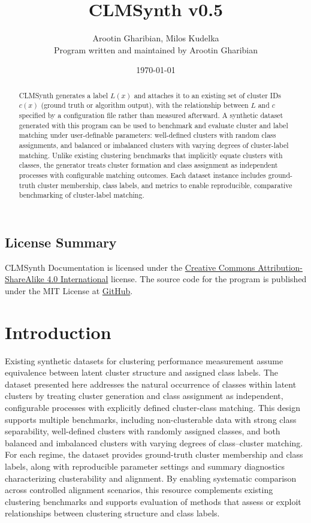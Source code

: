 \documentclass[a4paper,12pt]{article}
\title{CLMSynth v0.5}
\author{Arootin Gharibian, Milos Kudelka \\
\small\normalfont Program written and maintained by Arootin Gharibian}
\date{\today}
\begin{document}
\maketitle

\begin{abstract}
CLMSynth generates a label $L(x)$ and attaches it to an existing set of cluster IDs $c(x)$ (ground truth or algorithm output), with the relationship between $L$ and $c$ specified by a configuration file rather than measured afterward. A synthetic dataset generated with this program can be used to benchmark and evaluate cluster and label matching under user-definable parameters: well-defined clusters with random class assignments, and balanced or imbalanced clusters with varying degrees of cluster-label matching. Unlike existing clustering benchmarks that implicitly equate clusters with classes, the generator treats cluster formation and class assignment as independent processes with configurable matching outcomes.  Each dataset instance includes ground-truth cluster membership, class labels, and metrics to enable reproducible, comparative benchmarking of cluster-label matching.

\end{abstract}

\subsection*{License Summary}
CLMSynth Documentation is licensed under the \href{https://creativecommons.org/licenses/by-sa/4.0/}{Creative Commons Attribution-ShareAlike 4.0 International} license. The source code for the program is published under the MIT License at \href{https://github.com/A-Gharibian/CLMSynth}{GitHub}.

\newpage
\section{Introduction}
Existing synthetic datasets for clustering performance measurement assume equivalence between latent cluster structure and assigned class labels. The dataset presented here addresses the natural occurrence of classes within latent clusters by treating cluster generation and class assignment as independent, configurable processes with explicitly defined cluster-class matching. This design supports multiple benchmarks, including non-clusterable data with strong class separability, well-defined clusters with randomly assigned classes, and both balanced and imbalanced clusters with varying degrees of class–cluster matching. For each regime, the dataset provides ground-truth cluster membership and class labels, along with reproducible parameter settings and summary diagnostics characterizing clusterability and alignment. By enabling systematic comparison across controlled alignment scenarios, this resource complements existing clustering benchmarks and supports evaluation of methods that assess or exploit relationships between clustering structure and class labels.
\end{document}
